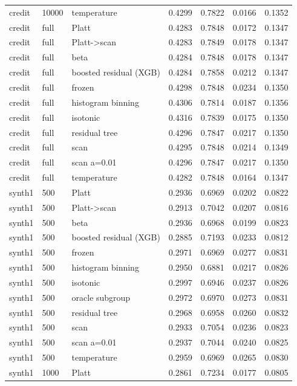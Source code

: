 \begin{tabular}{lllrrrr}
credit & 10000 & temperature & 0.4299 & 0.7822 & 0.0166 & 0.1352 \\
credit & full & Platt & 0.4283 & 0.7848 & 0.0172 & 0.1347 \\
credit & full & Platt->scan & 0.4283 & 0.7849 & 0.0178 & 0.1347 \\
credit & full & beta & 0.4284 & 0.7848 & 0.0178 & 0.1347 \\
credit & full & boosted residual (XGB) & 0.4284 & 0.7858 & 0.0212 & 0.1347 \\
credit & full & frozen & 0.4298 & 0.7848 & 0.0234 & 0.1350 \\
credit & full & histogram binning & 0.4306 & 0.7814 & 0.0187 & 0.1356 \\
credit & full & isotonic & 0.4316 & 0.7839 & 0.0175 & 0.1350 \\
credit & full & residual tree & 0.4296 & 0.7847 & 0.0217 & 0.1350 \\
credit & full & scan & 0.4295 & 0.7848 & 0.0214 & 0.1349 \\
credit & full & scan a=0.01 & 0.4296 & 0.7847 & 0.0217 & 0.1350 \\
credit & full & temperature & 0.4282 & 0.7848 & 0.0164 & 0.1347 \\
synth1 & 500 & Platt & 0.2936 & 0.6969 & 0.0202 & 0.0822 \\
synth1 & 500 & Platt->scan & 0.2913 & 0.7042 & 0.0207 & 0.0816 \\
synth1 & 500 & beta & 0.2936 & 0.6968 & 0.0199 & 0.0823 \\
synth1 & 500 & boosted residual (XGB) & 0.2885 & 0.7193 & 0.0233 & 0.0812 \\
synth1 & 500 & frozen & 0.2971 & 0.6969 & 0.0277 & 0.0831 \\
synth1 & 500 & histogram binning & 0.2950 & 0.6881 & 0.0217 & 0.0826 \\
synth1 & 500 & isotonic & 0.2997 & 0.6946 & 0.0237 & 0.0826 \\
synth1 & 500 & oracle subgroup & 0.2972 & 0.6970 & 0.0273 & 0.0831 \\
synth1 & 500 & residual tree & 0.2968 & 0.6958 & 0.0260 & 0.0832 \\
synth1 & 500 & scan & 0.2933 & 0.7054 & 0.0236 & 0.0823 \\
synth1 & 500 & scan a=0.01 & 0.2937 & 0.7044 & 0.0240 & 0.0825 \\
synth1 & 500 & temperature & 0.2959 & 0.6969 & 0.0265 & 0.0830 \\
synth1 & 1000 & Platt & 0.2861 & 0.7234 & 0.0177 & 0.0805 \\

\end{tabular}
